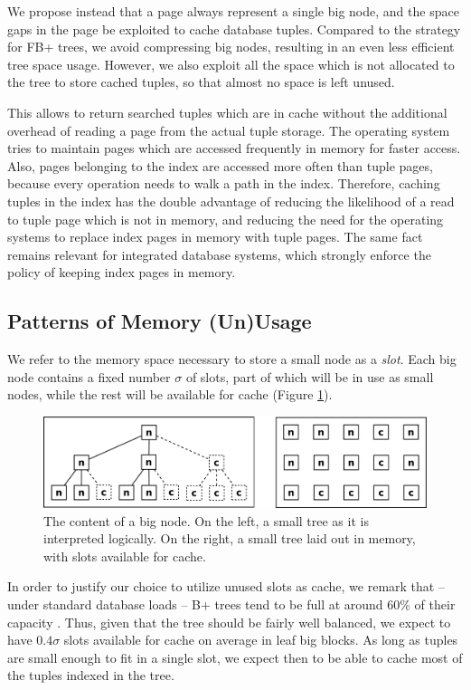 \documentclass{article}
\begin{document}
We propose instead that a page always represent a single big node, and the space gaps in the page
be exploited to cache database tuples.
Compared to the strategy for FB+ trees, we avoid compressing big nodes, resulting in an
even less efficient tree space usage.
However, we also exploit all the space which is not allocated to the tree to store cached tuples,
so that almost no space is left unused.

This allows to return searched tuples which are in cache without the additional overhead of reading a page from
the actual tuple storage.
The operating system tries to maintain pages which are accessed frequently in memory for faster
access.
Also, pages belonging to the index are accessed more often than tuple pages, because every operation
needs to walk a path in the index.
Therefore, caching tuples in the index has the double advantage of reducing the likelihood
of a read to tuple page which is not in memory, and reducing the need for the operating systems
to replace index pages in memory with tuple pages.
The same fact remains relevant for integrated database systems, which strongly enforce the policy of keeping
index pages in memory.


\subsection{Patterns of Memory (Un)Usage}

We refer to the memory space necessary to store a small node as a \textit{slot}.
Each big node contains a fixed number $\sigma$ of slots, part of which will be in use
as small nodes, while the rest will be available for cache (Figure \ref{fig:inner_block}).
\begin{figure}[h]
\begin{center}
\includegraphics[width=350pt]{inner_block}
\end{center}
\caption{
The content of a big node.
On the left, a small tree as it is interpreted logically.
On the right, a small tree laid out in memory, with slots available for cache.
}
\label{fig:inner_block}
\end{figure}

In order to justify our choice to utilize unused slots as cache,
we remark that -- under standard database loads --
B+ trees tend to be full at around 60\% of their capacity \citep{Wu:2011}.
Thus, given that the tree should be fairly well balanced,
we expect to have $0.4 \sigma$ slots available for cache on average in leaf big blocks.
As long as tuples are small enough to fit in a single slot,
we expect then to be able to cache most of the tuples indexed in the tree.
\end{document}

